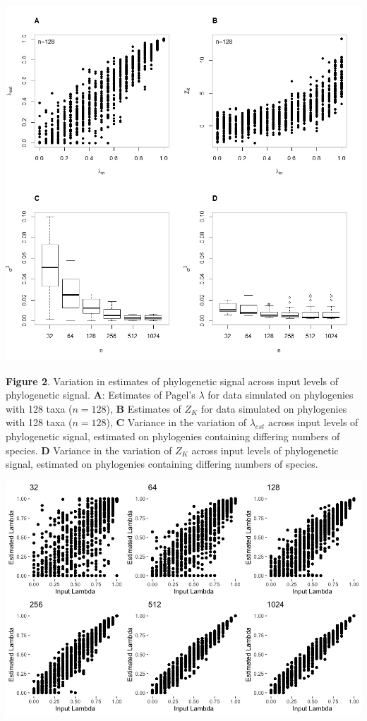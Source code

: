 \documentclass[
]{article}
\begin{document}
\newpage

\includegraphics[width=0.95\linewidth]{Fig2}

\singlespacing \textbf{Figure 2}. Variation in estimates of phylogenetic
signal across input levels of phylogenetic signal. \textbf{A}: Estimates
of Pagel's \(\lambda\) for data simulated on phylogenies with 128 taxa
(\(n=128\)), \textbf{B} Estimates of \(Z_K\) for data simulated on
phylogenies with 128 taxa (\(n=128\)), \textbf{C} Variance in the
variation of \(\lambda_{est}\) across input levels of phylogenetic
signal, estimated on phylogenies containing differing numbers of
species. \textbf{D} Variance in the variation of \(Z_K\) across input
levels of phylogenetic signal, estimated on phylogenies containing
differing numbers of species.

\newpage

\includegraphics[width=0.95\linewidth]{Fig1}
\end{document}
